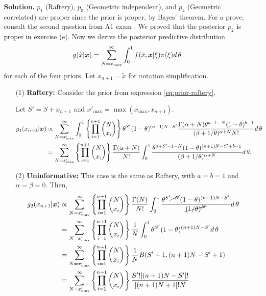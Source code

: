 \vspace{2ex}

    {\bf Solution.} $p_1$ (Raftery), $p_3$ (Geometric independent), and $p_4$
    (Geometric correlated) are proper since the prior is proper, by Bayes'
    theorem. For a prove, consult the second question from A1 exam
    \cite[]{github}. We proved that the posterior $p_2$ is proper in exercise (e).
    Now we derive the posterior predictive distribution
    $$
    g(\tilde{x}|\boldsymbol{x}) = \sum_{N=x_{\max}}^{\infty} \int_0^1 f(\tilde{x}, \boldsymbol{x}|\xi)\pi(\xi) d \, \theta
    $$
    for each of the four priors. Let $x_{n+1} = \tilde{x}$ for notation simplification.

    \begin{enumerate}
        \item[(1)] {\bf Raftery:} Consider the prior from expression
        \ref{eq:prior-raftery}. 
        
        Let $S' = S + x_{n+1}$ and $x'_{\max} =
        \max(x_{\max}, x_{n+1})$.
        \begin{equation*}
            \begin{split}
                g_1(x_{n+1}|\boldsymbol{x}) &\propto \sum_{N=x'_{\max}}^{\infty} \int_0^1 \left\{\prod_{i=1}^{n+1}\binom{N}{x_i}\right\}\theta^{S'}(1-\theta)^{(n+1)N-S'}\frac{\Gamma(\alpha+N)\theta^{a-1-N}(1-\theta)^{b-1}}{(\beta + 1/\theta)^{\alpha + N}N!} d \, \theta \\
                &= \sum_{N=x'_{\max}}^{\infty} \left\{\prod_{i=1}^{n+1}\binom{N}{x_i}\right\}\frac{\Gamma(\alpha + N)}{N!}\int_0^1 \frac{\theta^{a+S'-1-N}(1-\theta)^{(n+1)N-S'+b-1}}{(\beta + 1/\theta)^{\alpha + N}} d \, \theta. \\
            \end{split}
        \end{equation*} 

        \item[(2)] {\bf Uninformative:} This case is the same as Raftery, with
        $a = b = 1$ and $\alpha = \beta = 0$. Then,
        \begin{equation*}
            \begin{split}
                g_2(x_{n+1}|\boldsymbol{x}) &\propto \sum_{N=x'_{\max}}^{\infty} \left\{\prod_{i=1}^{n+1}\binom{N}{x_i}\right\}\frac{\Gamma(N)}{N!}\int_0^1 \frac{\theta^{S'\cancel{-N}}(1-\theta)^{(n+1)N-S'}}{\cancel{(1/\theta)^{N}}} d \, \theta \\
                &= \sum_{N=x'_{\max}}^{\infty} \left\{\prod_{i=1}^{n+1}\binom{N}{x_i}\right\}\frac{1}{N}\int_0^1 \theta^{S'}(1-\theta)^{(n+1)N-S'} d \, \theta \\
                &= \sum_{N=x'_{\max}}^{\infty} \left\{\prod_{i=1}^{n+1}\binom{N}{x_i}\right\}\frac{1}{N} B(S'+1, (n+1)N-S'+1)\\
                &= \sum_{N=x'_{\max}}^{\infty} \left\{\prod_{i=1}^{n+1}\binom{N}{x_i}\right\}\frac{S'![(n+1)N-S']!}{[(n+1)N+1]! N}.
            \end{split}
        \end{equation*} 


\end{enumerate}
